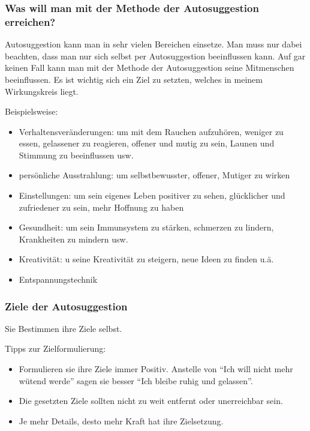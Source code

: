 \subsubsection{Was will man mit der Methode der Autosuggestion erreichen?}
Autosuggestion kann man in sehr vielen Bereichen einsetze. Man muss nur dabei beachten, dass man nur
sich selbst per Autosuggestion beeinflussen kann. Auf gar keinen Fall kann man  mit der Methode der
Autosuggestion seine Mitmenschen beeinflussen. Es ist wichtig sich ein Ziel zu setzten, welches in
meinem Wirkungskreis liegt.



Beispielsweise:
\begin{itemize}
	\item Verhaltensveränderungen: \zB um mit dem Rauchen aufzuhören, weniger zu essen, gelassener
zu reagieren, offener und mutig zu sein, Launen und Stimmung zu beeinflussen usw.

	\item persönliche Ausstrahlung: \zB um selbstbewusster, offener, Mutiger zu wirken
	\item Einstellungen: \zB um sein eigenes Leben positiver zu sehen, glücklicher und zufriedener
zu sein, mehr Hoffnung zu haben

	\item Gesundheit: \zB um sein Immunsystem zu stärken, schmerzen zu lindern, Krankheiten zu
mindern usw.

	\item Kreativität: \zB u seine Kreativität zu steigern, neue Ideen zu finden u.ä.
	\item Entspannungstechnik
\end{itemize}

\subsubsection{Ziele der Autosuggestion}

Sie Bestimmen ihre Ziele selbst.

Tipps zur  Zielformulierung:
\begin{itemize}
	\item Formulieren sie ihre Ziele immer Positiv. Anstelle von \enquote{Ich will nicht mehr wütend werde}
		sagen sie besser \enquote{Ich bleibe ruhig und gelassen}.
	\item Die gesetzten Ziele sollten nicht zu weit entfernt oder unerreichbar sein.
	\item Je mehr Details, desto mehr Kraft hat ihre Zielsetzung.
\end{itemize}


